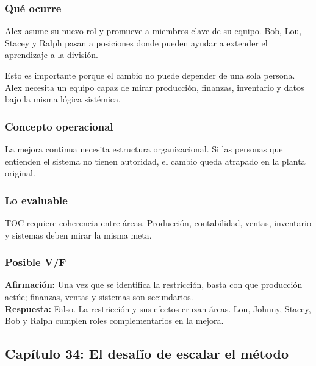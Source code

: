 \documentclass[
  11pt,
]{article}
\begin{document}
\hypertarget{quuxe9-ocurre-6}{%
\subsubsection{Qué ocurre}\label{quuxe9-ocurre-6}}

Alex asume su nuevo rol y promueve a miembros clave de su equipo. Bob,
Lou, Stacey y Ralph pasan a posiciones donde pueden ayudar a extender el
aprendizaje a la división.

Esto es importante porque el cambio no puede depender de una sola
persona. Alex necesita un equipo capaz de mirar producción, finanzas,
inventario y datos bajo la misma lógica sistémica.

\hypertarget{concepto-operacional-6}{%
\subsubsection{Concepto operacional}\label{concepto-operacional-6}}

La mejora continua necesita estructura organizacional. Si las personas
que entienden el sistema no tienen autoridad, el cambio queda atrapado
en la planta original.

\hypertarget{lo-evaluable-6}{%
\subsubsection{Lo evaluable}\label{lo-evaluable-6}}

TOC requiere coherencia entre áreas. Producción, contabilidad, ventas,
inventario y sistemas deben mirar la misma meta.

\hypertarget{posible-vf-6}{%
\subsubsection{Posible V/F}\label{posible-vf-6}}

\textbf{Afirmación:} Una vez que se identifica la restricción, basta con
que producción actúe; finanzas, ventas y sistemas son secundarios.\\
\textbf{Respuesta:} Falso. La restricción y sus efectos cruzan áreas.
Lou, Johnny, Stacey, Bob y Ralph cumplen roles complementarios en la
mejora.

\hypertarget{capuxedtulo-34-el-desafuxedo-de-escalar-el-muxe9todo}{%
\subsection{Capítulo 34: El desafío de escalar el
método}\label{capuxedtulo-34-el-desafuxedo-de-escalar-el-muxe9todo}}
\end{document}
